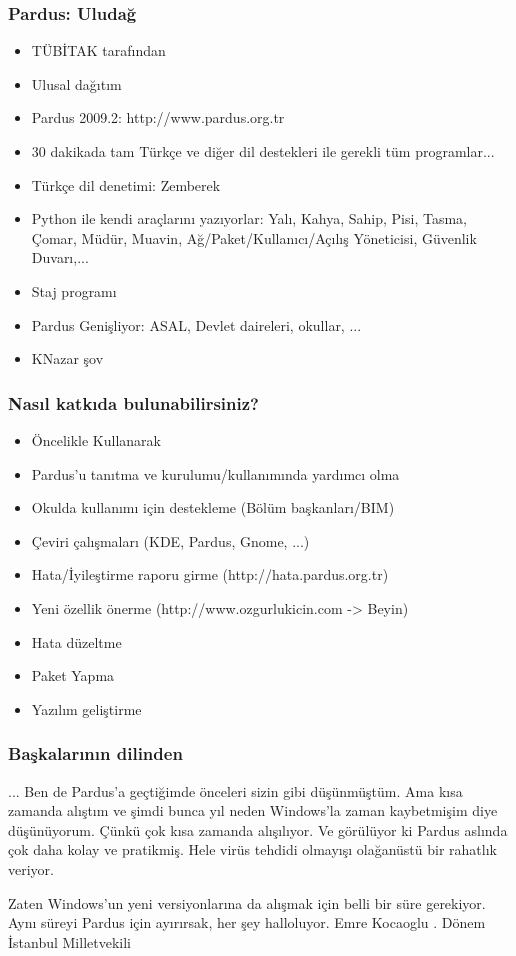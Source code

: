 \documentclass{beamer}
\begin{document}
	\begin{frame}
	 	\frametitle{Pardus: Uludağ}
		\begin{itemize}[<+->]
		 \item TÜBİTAK tarafından
		 \item Ulusal dağıtım
		 \item Pardus 2009.2: http://www.pardus.org.tr
		 \item 30 dakikada tam Türkçe ve diğer dil destekleri ile gerekli tüm programlar...
		 \item Türkçe dil denetimi: Zemberek
		 \item Python ile kendi araçlarını yazıyorlar: Yalı, Kahya, Sahip, Pisi, Tasma, Çomar, Müdür, Muavin, Ağ/Paket/Kullanıcı/Açılış Yöneticisi, Güvenlik Duvarı,...
		 \item Staj programı
		 \item Pardus Genişliyor: ASAL, Devlet daireleri, okullar, ...		 
		 \item KNazar şov
		\end{itemize}

	\end{frame}
	\begin{frame}
	 \frametitle{Nasıl katkıda bulunabilirsiniz?}
		\begin{itemize}[<+->]
		 \item Öncelikle Kullanarak
		 \item Pardus'u tanıtma ve kurulumu/kullanımında yardımcı olma
		 \item Okulda kullanımı için destekleme (Bölüm başkanları/BIM)
		 \item Çeviri çalışmaları (KDE, Pardus, Gnome, ...)
		 \item Hata/İyileştirme raporu girme (http://hata.pardus.org.tr)
		 \item Yeni özellik önerme (http://www.ozgurlukicin.com -> Beyin)
		 \item Hata düzeltme
		 \item Paket Yapma
		 \item Yazılım geliştirme
		\end{itemize}

	\end{frame}

	\begin{frame}
	\frametitle{Başkalarının dilinden}
	... Ben de Pardus'a geçtiğimde önceleri sizin gibi
	düşünmüştüm. Ama kısa zamanda alıştım ve şimdi bunca yıl neden Windows'la
	zaman kaybetmişim diye düşünüyorum. Çünkü çok kısa zamanda alışılıyor. Ve
	görülüyor ki Pardus aslında çok daha kolay ve pratikmiş. Hele virüs tehdidi
	olmayışı olağanüstü bir rahatlık veriyor.
	
	Zaten Windows'un yeni versiyonlarına da alışmak için belli bir süre gerekiyor.
	Aynı süreyi Pardus için ayırırsak, her şey halloluyor.
	\newline
	\newline
	Emre Kocaoglu
	. Dönem İstanbul Milletvekili
	\end{frame}
	
\end{document}
